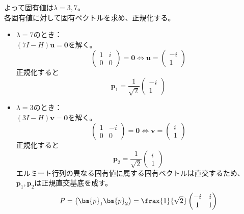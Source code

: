 \begin{souanswer}
\begin{enumerate}
\begin{equation*}
\end{equation*}
    よって固有値は$\lambda= 3, 7$。\\
    各固有値に対して固有ベクトルを求め、正規化する。
\begin{itemize}
    \item $\lambda= 7$のとき：\\
    $(7I- H)\bm{u}= \bm{0}$を解く。
\begin{equation*}
    \begin{pmatrix}1& i\\ 0& 0\end{pmatrix}= \bm{0}\iff \bm{u}= \begin{pmatrix}-i\\ 1\end{pmatrix}
\end{equation*}
    正規化すると
\begin{equation*}
    \bm{p}_1= \frac{1}{\sqrt{2}}\begin{pmatrix}-i\\ 1\end{pmatrix}
\end{equation*}
    \item $\lambda= 3$のとき：\\
    $(3I- H)\bm{v}= \bm{0}$を解く。
\begin{equation*}
    \begin{pmatrix}1& -i\\ 0& 0\end{pmatrix}= \bm{0}\iff \bm{v}= \begin{pmatrix}i\\ 1\end{pmatrix}
\end{equation*}
    正規化すると
\begin{equation*}
    \bm{p}_2= \frac{1}{\sqrt{2}}\begin{pmatrix}i\\ 1\end{pmatrix}
\end{equation*}
    エルミート行列の異なる固有値に属する固有ベクトルは直交するため、$\bm{p}_1, \bm{p}_2$は正規直交基底を成す。
\begin{equation*}
    P= \begin{pmatrix}\bm{p}_1 \bm{p}_2\end{pmatrix}= \frax{1}{\sqrt{2}}\begin{pmatrix}-i& i\\ 1& 1\end{pmatrix}
\end{equation*}

\end{itemize}
\end{enumerate}
\end{souanswer}
